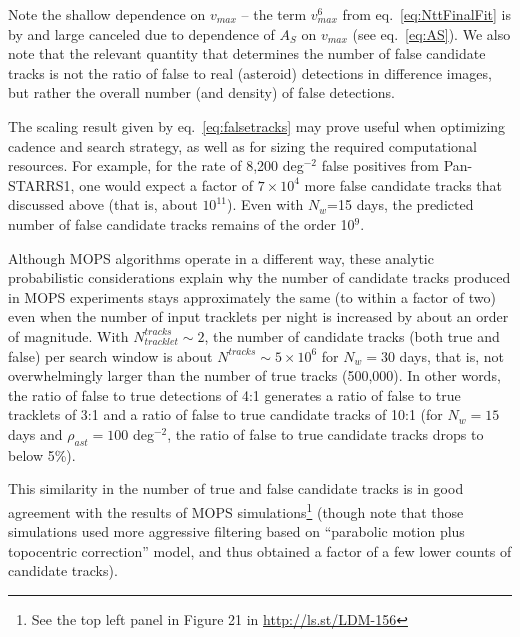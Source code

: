 Note the shallow dependence on $v_{max}$ -- the term $v_{max}^6$
from eq.~\ref{eq:NttFinalFit} is by and large canceled due to dependence of $A_S$ on
$v_{max}$ (see eq.~\ref{eq:AS}). We also note that the relevant quantity that determines
the number of false candidate tracks is not the ratio of false to real (asteroid) detections
in difference images, but rather the overall number (and density) of false detections.

The scaling result given by eq.~\ref{eq:falsetracks} may prove useful when optimizing cadence
and search strategy, as well as for sizing the required computational resources. For example,
for the rate of 8,200 deg$^{-2}$ false positives from Pan-STARRS1, one would expect a factor
of $7\times10^4$ more false candidate tracks that discussed above (that is, about $10^{11}$).
Even with $N_w$=15 days, the predicted number of false candidate tracks remains of the
order 10$^9$.

Although MOPS algorithms operate in a different way, these analytic probabilistic considerations
explain why the number of candidate tracks produced in MOPS experiments stays approximately
the same (to within a factor of two) even when the number of input tracklets per night is increased
by about an order of magnitude. With $N_{tracklet}^{tracks} \sim2$, the number of  candidate
tracks (both true and false) per search window is about $N^{tracks} \sim 5\times10^6$ for $N_w= 30$ days,
that is, not overwhelmingly larger than the number of true tracks (500,000). In other words, the ratio of
false to true detections of 4:1 generates a ratio of false to true tracklets of 3:1 and a ratio of false to true
candidate tracks of 10:1 (for $N_w=15$ days and $\rho_{ast}=100$ deg$^{-2}$, the ratio of false to true
candidate tracks drops to below 5\%).

This similarity in the number of true and false candidate tracks is in good
agreement with the results of MOPS simulations\footnote{See the top left panel
in Figure 21 in \url{http://ls.st/LDM-156}} (though note that those simulations used more aggressive filtering
based on ``parabolic motion plus topocentric correction'' model, and thus obtained a factor of a few
lower counts of candidate tracks).

